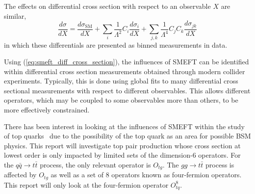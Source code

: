 \documentclass[a4paper,11pt]{article}
\begin{document}
The effects on differential cross section with respect to an observable $X$ are similar,
\begin{equation}\label{eq:smeft_diff_cross_section}
    \frac{d\sigma}{dX} = \frac{d\sigma_{\text{SM}}}{dX} + \sum\limits_{i} \frac{1}{\Lambda^2} C_{i} \frac{d\sigma_{i}}{dX} + \sum\limits_{j,k} \frac{1}{\Lambda^4} C_{j} C_{k} \frac{d\sigma_{j k}}{dX}
\end{equation}
in which these differentials are presented as binned measurements in data.

Using (\ref{eq:smeft_diff_cross_section}), the influences of SMEFT can be identified within differential cross section measurements obtained through modern collider experiments.
Typically, this is done using global fits to many differential cross sectional measurements with respect to different observables.
This allows different operators, which may be coupled to some observables more than others, to be more effectively constrained.

There has been interest in looking at the influences of SMEFT within the study of top quarks~\cite{Hartland_2019,Buckley_2015,Brivio_2020} due to the possibility of the top quark as an area for possible BSM physics.
This report will investigate top pair production whose cross section at lowest order is only impacted by limited sets of the dimension-6 operators. For the $q\bar{q} \rightarrow t\bar{t}$ process, the only relevant operator is $O_{tg}$.
The $gg \rightarrow t\bar{t}$ process is affected by $O_{tg}$ as well as a set of 8 operators known as four-fermion operators.
This report will only look at the four-fermion operator $O_{tq}^{8}$.

\end{document}
